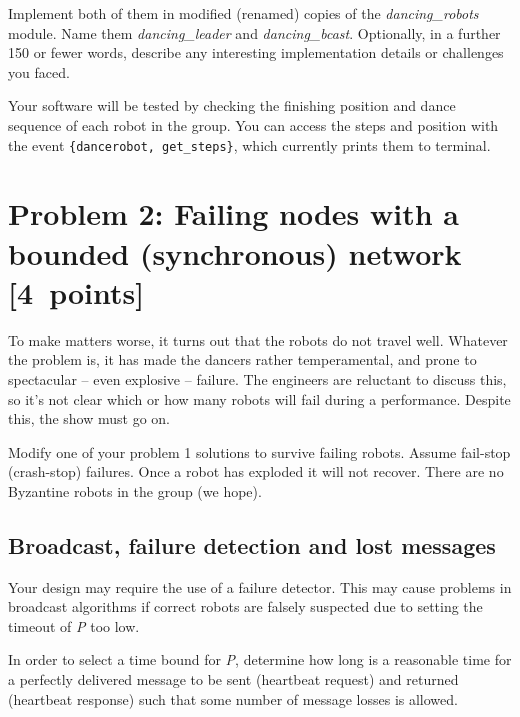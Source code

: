 \documentclass[a4paper]{article}
\begin{document}
Implement both of them in modified (renamed) copies of the
\emph{dancing\_robots} module. Name them \emph{dancing\_leader} and
\emph{dancing\_bcast}. Optionally, in a further 150 or fewer words, describe any
interesting implementation details or challenges you faced.

Your software will be tested by checking the finishing position and dance
sequence of each robot in the group. You can access the steps and position
with the event \verb!{dancerobot, get_steps}!, which currently prints them
to terminal.












\section*{Problem 2: Failing nodes with a bounded (synchronous) network [4~points]} %
\label{sec:problem_2_failing_nodes}

To make matters worse, it turns out that the robots do not travel well.
Whatever the problem is, it has made the dancers rather temperamental, and
prone to spectacular -- even explosive -- failure. The engineers are reluctant
to discuss this, so it's not clear which or how many robots will fail during
a performance. Despite this, the show must go on.

Modify one of your problem 1 solutions to survive failing robots. Assume
fail-stop (crash-stop) failures. Once a robot has exploded it will not
recover. There are no Byzantine robots in the group (we hope).


\subsection*{Broadcast, failure detection and lost messages} %
\label{subsec:lost_messages}

Your design may require the use of a failure detector. This may cause problems
in broadcast algorithms if correct robots are falsely suspected due to setting
the timeout of \emph{P} too low.

In order to select a time bound for \emph{P}, determine how long is a
reasonable time for a perfectly delivered message to be sent (heartbeat
request) and returned (heartbeat response) such that some number of message
losses is allowed.
\end{document}
